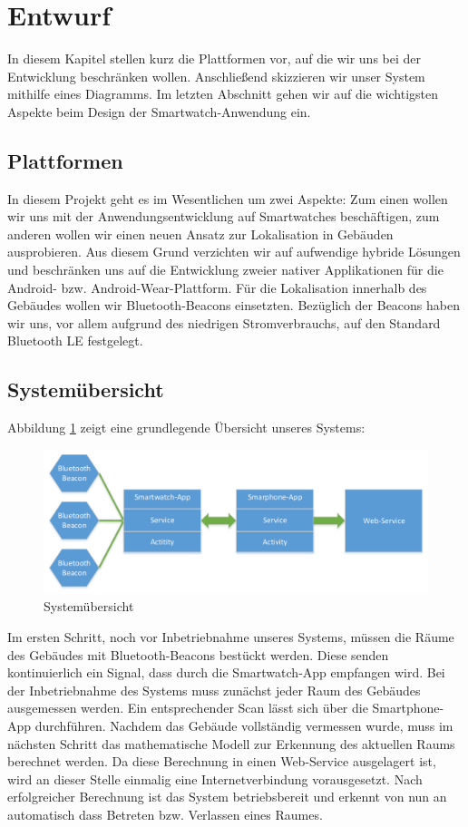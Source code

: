 \section{Entwurf}
In diesem Kapitel stellen kurz die Plattformen vor, auf die wir uns bei der Entwicklung beschränken wollen. Anschließend skizzieren wir unser System mithilfe eines Diagramms. Im letzten Abschnitt gehen wir auf die wichtigsten Aspekte beim Design der Smartwatch-Anwendung ein.

\subsection{Plattformen}
In diesem Projekt geht es im Wesentlichen um zwei Aspekte: Zum einen wollen wir uns mit der Anwendungsentwicklung auf Smartwatches beschäftigen, zum anderen wollen wir einen neuen Ansatz zur Lokalisation in Gebäuden ausprobieren. Aus diesem Grund verzichten wir auf aufwendige hybride Lösungen und beschränken uns auf die Entwicklung zweier nativer Applikationen für die Android- bzw. Android-Wear-Plattform. Für die Lokalisation innerhalb des Gebäudes wollen wir Bluetooth-Beacons einsetzten. Bezüglich der Beacons haben wir uns, vor allem aufgrund des niedrigen Stromverbrauchs, auf den Standard Bluetooth LE festgelegt.

\subsection{Systemübersicht}
\label{sec:systemuebersicht}
Abbildung \ref{fig:Übersicht} zeigt eine grundlegende Übersicht unseres Systems:

\begin{figure}[H]
\centering
\includegraphics[width=0.95\linewidth]{Bilder/Uebersicht}
\caption{Systemübersicht}
\label{fig:Übersicht}
\end{figure}

Im ersten Schritt, noch vor Inbetriebnahme unseres Systems, müssen die Räume des Gebäudes mit Bluetooth-Beacons bestückt werden. Diese senden kontinuierlich ein Signal, dass durch die Smartwatch-App empfangen wird. Bei der Inbetriebnahme des Systems muss zunächst jeder Raum des Gebäudes ausgemessen werden. Ein entsprechender Scan lässt sich über die Smartphone-App durchführen. Nachdem das Gebäude vollständig vermessen wurde, muss im nächsten Schritt das mathematische Modell zur Erkennung des aktuellen Raums berechnet werden. Da diese Berechnung in einen Web-Service ausgelagert ist, wird an dieser Stelle einmalig eine Internetverbindung vorausgesetzt. Nach erfolgreicher Berechnung ist das System betriebsbereit und erkennt von nun an automatisch dass Betreten bzw. Verlassen eines Raumes.

